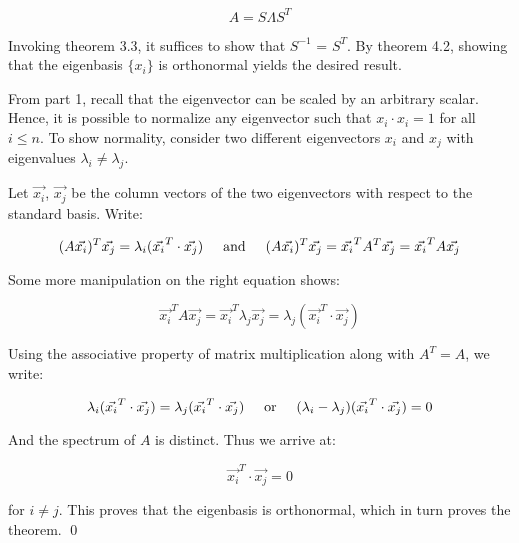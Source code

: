 \documentclass{article}
\newcommand{\textOr}{
    {
        \hspace{5mm}
        \textrm{or}
        \hspace{5mm}
    }
}
\newcommand{\textAnd}{
    {
        \hspace{5mm}
        \textrm{and}
        \hspace{5mm}
    }
}
\begin{document}
\[
    A = S \Lambda S^T
\]

\proof Invoking theorem 3.3, it suffices to show that $S^{-1}$ = $S^T$. 
By theorem 4.2, showing that the eigenbasis $\{x_i\}$ is orthonormal 
yields the desired result. 

From part 1, recall that the eigenvector 
can be scaled by an arbitrary scalar. Hence, it is possible to normalize 
any eigenvector such that $x_i\cdot x_i = 1$ for all $i\leq n$. 
To show normality, consider two different eigenvectors $x_i$ and 
$x_j$ with eigenvalues $\lambda_i \neq \lambda_j$. 

Let $\vec{x_i}$, $\vec{x_j}$ be the column vectors of the two eigenvectors 
with respect to the standard basis. Write:

\[
    (A\vec{x_i})^T\vec{x_j} = \lambda_i(\vec{x_i}^T \cdot \vec{x_j}) 
    \textAnd 
   (A\vec{x_i})^T\vec{x_j}  = \vec{x_i}^TA^T\vec{x_j} 
   =\vec{x_i}^TA\vec{x_j}
\]

Some more manipulation on the right equation shows:

\[
    \vec{x_i}^TA\vec{x_j} = \vec{x_i}^T\lambda_j\vec{x_j}
    =\lambda_j(\vec{x_i}^T\cdot\vec{x_j})
\]

Using the associative property of matrix multiplication along with 
$A^T = A$, we write:

\[
    \lambda_i(\vec{x_i}^T\cdot\vec{x_j}) =\lambda_j(\vec{x_i}^T\cdot\vec{x_j}) 
    \textOr 
    (\lambda_i - \lambda_j)(\vec{x_i}^T\cdot\vec{x_j}) = 0
\]

And the spectrum of $A$ is distinct. Thus we arrive at:

\[
    \vec{x_i}^T\cdot\vec{x_j} = 0
\]

for $i \neq j$. This proves that the eigenbasis is orthonormal, which 
in turn proves the theorem. 
\qed
\end{document}
